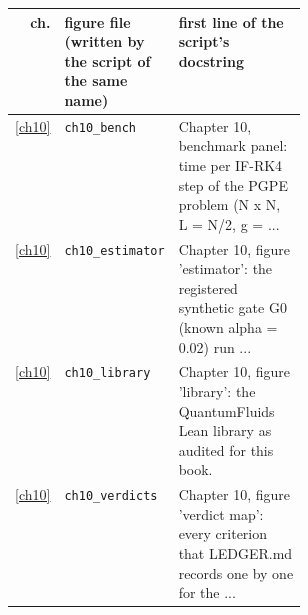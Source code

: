\begin{center}\footnotesize\setlength{\tabcolsep}{3pt}\begin{tabularx}{\linewidth}{@{}r>{\raggedright}p{0.34\linewidth}>{\raggedright\arraybackslash}X@{}}\toprule ch. & figure file (written by the script of the same name) & first line of the script's docstring\\\midrule
\ref{ch10} & \texttt{ch10\_\allowbreak{}bench} & Chapter 10,\allowbreak{} benchmark panel: time per IF-\allowbreak{}RK4 step of the PGPE problem (N x N,\allowbreak{} L = N/\allowbreak{}2,\allowbreak{} g = .\allowbreak{}.\allowbreak{}.\allowbreak{} \\
\ref{ch10} & \texttt{ch10\_\allowbreak{}estimator} & Chapter 10,\allowbreak{} figure 'estimator': the registered synthetic gate G0 (known alpha = 0.\allowbreak{}02) run .\allowbreak{}.\allowbreak{}.\allowbreak{} \\
\ref{ch10} & \texttt{ch10\_\allowbreak{}library} & Chapter 10,\allowbreak{} figure 'library': the QuantumFluids Lean library as audited for this book.\allowbreak{} \\
\ref{ch10} & \texttt{ch10\_\allowbreak{}verdicts} & Chapter 10,\allowbreak{} figure 'verdict map': every criterion that LEDGER.\allowbreak{}md records one by one for the .\allowbreak{}.\allowbreak{}.\allowbreak{} \\
\bottomrule\end{tabularx}\end{center}
